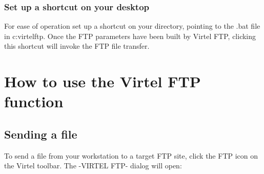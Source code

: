 \documentclass[letterpaper,10pt,english]{sphinxmanual}
\begin{document}
\subsection{Set up a shortcut on your desktop}
\label{\detokenize{TN201905:set-up-a-shortcut-on-your-desktop}}
For ease of operation set up a shortcut on your directory, pointing to the .bat file in c:virtelftp. Once the FTP parameters have been built by Virtel FTP, clicking this shortcut will invoke the FTP file transfer.




\chapter{How to use the Virtel FTP function}
\label{\detokenize{TN201905:how-to-use-the-virtel-ftp-function}}

\section{Sending a file}
\label{\detokenize{TN201905:sending-a-file}}
To send a file from your workstation to a target FTP site, click the FTP icon on the Virtel toolbar. The -VIRTEL FTP- dialog will open:
\end{document}
